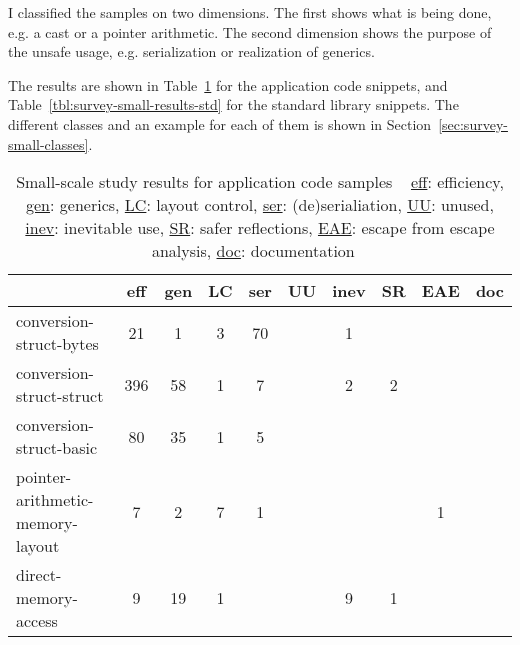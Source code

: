 I classified the samples on two dimensions.
The first shows what is being done, e.g. a cast or a pointer arithmetic.
The second dimension shows the purpose of the unsafe usage, e.g. serialization or realization of generics.

The results are shown in Table~\ref{tbl:survey-small-results-app} for the application code snippets, and
Table~\ref{tbl:survey-small-results-std} for the standard library snippets.
The different classes and an example for each of them is shown in Section~\ref{sec:survey-small-classes}.

\begin{table}[h]
    \centering
    \caption[Small-scale study results for application code samples]%
    {Small-scale study results for application code samples \newline \tiny ~ \newline \small
        \underline{eff}: efficiency, \underline{gen}: generics, \underline{LC}: layout control,
        \underline{ser}: (de)serialiation, \underline{UU}: unused, \underline{inev}: inevitable use,
        \underline{SR}: safer reflections, \underline{EAE}: escape from escape analysis,
        \underline{doc}: documentation \newline \tiny ~}
    \label{tbl:survey-small-results-app}
    \begin{tabularx}{\textwidth}{Xccccccccc}
        \toprule
        {} & eff & gen & LC & ser & UU & inev & SR & EAE & doc \\
        \midrule
        conversion-struct-bytes &         21 &        1 &              3 &            70 &        &          1 &               &                        &               \\
        \rowcolor{verylightgray}
        conversion-struct-struct &        396 &       58 &              1 &             7 &        &          2 &             2 &                        &               \\
        conversion-struct-basic &         80 &       35 &              1 &             5 &        &            &               &                        &               \\
        \rowcolor{verylightgray}
        pointer-arithmetic-memory-layout &          7 &        2 &              7 &             1 &        &            &               &                      1 &               \\
        direct-memory-access &          9 &       19 &              1 &               &        &          9 &             1 &                        &               \\

\end{tabularx}
\end{table}
